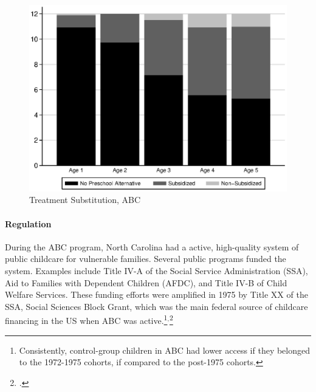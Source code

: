 \begin{appendices}
\begin{center}
	\begin{figure}[H]
		\caption{Treatment Substitution, ABC} \label{fig:ccabc}
		\centering
		\includegraphics[width=.9\columnwidth]{output/blackwhite_CCnumber.eps}
	\end{figure}
\end{center}

\paragraph{Regulation}

\noindent During the ABC program, North Carolina had a active, high-quality system of public childcare for vulnerable families. Several public programs funded the system. Examples include Title IV-A of the Social Service Administration (SSA), Aid to Families with Dependent Children (AFDC), and Title IV-B of Child Welfare Services. These funding efforts were amplified in 1975 by Title XX of the SSA, Social Sciences Block Grant, which was the main federal source of childcare financing in the US when ABC was active.\footnote{Consistently, control-group children in ABC had lower access if they belonged to the 1972-1975 cohorts, if compared to the post-1975 cohorts.}$^{,}$\footnote{\citet{Robins_1988_Federal-Child-Care}.}\\


\end{appendices}
